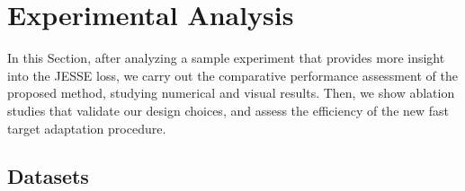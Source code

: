 \documentclass[journal]{IEEEtran}
\begin{document}
\section{Experimental Analysis}
\label{sec:exp}

In this Section,
after analyzing a sample experiment that provides more insight into the JESSE loss,
we carry out the comparative performance assessment of the proposed method, studying numerical and visual results.
Then, we show ablation studies that validate our design choices,
and assess the efficiency of the new fast target adaptation procedure.



\subsection{Datasets}
\end{document}
